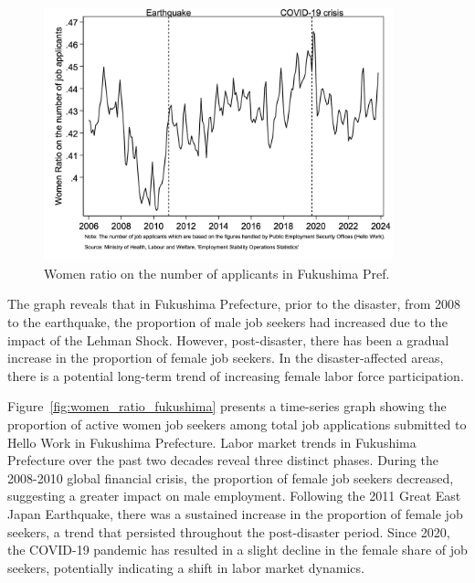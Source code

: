 \documentclass[a4paper,12pt]{article}
\begin{document}
\begin{figure}[h!]
    \centering
    \includegraphics[width=0.9\textwidth]{Women ratio on the number of job applicants.jpg}  %
    \caption{Women ratio on the number of applicants in Fukushima Pref.}
    \label{fig:fukushima_Women_ratio_on_applicant}
\end{figure}

\newpage

The graph reveals that in Fukushima Prefecture, prior to the disaster, from 2008 to the earthquake, the proportion of male job seekers had increased due to the impact of the Lehman Shock. However, post-disaster, there has been a gradual increase in the proportion of female job seekers. In the disaster-affected areas, there is a potential long-term trend of increasing female labor force participation.

Figure~\ref{fig:women_ratio_fukushima} presents a time-series graph showing the proportion of active women job seekers among total job applications submitted to Hello Work in Fukushima Prefecture. Labor market trends in Fukushima Prefecture over the past two decades reveal three distinct phases. During the 2008-2010 global financial crisis, the proportion of female job seekers decreased, suggesting a greater impact on male employment. Following the 2011 Great East Japan Earthquake, there was a sustained increase in the proportion of female job seekers, a trend that persisted throughout the post-disaster period. Since 2020, the COVID-19 pandemic has resulted in a slight decline in the female share of job seekers, potentially indicating a shift in labor market dynamics.
\end{document}
